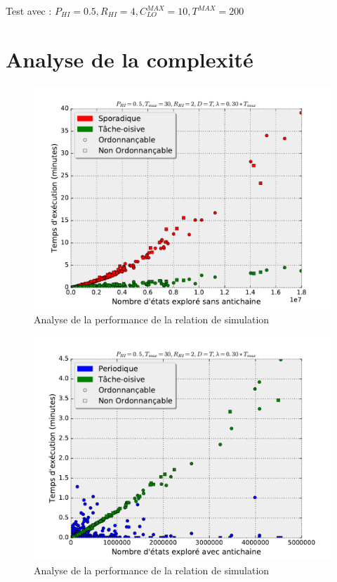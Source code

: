 \documentclass[12pt,a4paper,oneside]{book}
\theoremstyle{break}
\theoremstyle{breakplain}
\begin{document}
Test avec : $P_{HI} = 0.5, R_{HI} = 4, C^{MAX}_{LO} = 10, T^{MAX} = 200$

\section{Analyse de la complexité}

\begin{figure}[h]
\includegraphics[width=\textwidth]{./results/timeSpoIdle.pdf}
\caption{Analyse de la performance de la relation de simulation}
\end{figure}

\begin{figure}[h]
\includegraphics[width=\textwidth]{./results/timePerIdle.pdf}
\caption{Analyse de la performance de la relation de simulation}
\end{figure}
\end{document}
